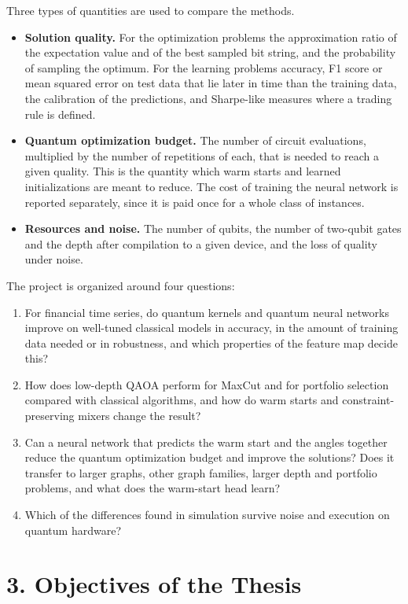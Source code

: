 \documentclass[12pt,a4paper]{article}
\begin{document}
Three types of quantities are used to compare the methods.
\begin{itemize}
  \item \textbf{Solution quality.}  For the optimization problems the
  approximation ratio of the expectation value and of the best sampled
  bit string, and the probability of sampling the optimum.  For the
  learning problems accuracy, F1 score or mean squared error on test
  data that lie later in time than the training data, the calibration
  of the predictions, and Sharpe-like measures where a trading rule
  is defined.
  \item \textbf{Quantum optimization budget.}  The number of circuit
  evaluations, multiplied by the number of repetitions of each, that
  is needed to reach a given quality.  This is the quantity which warm
  starts and learned initializations are meant to reduce.  The cost of
  training the neural network is reported separately, since it is paid
  once for a whole class of instances.
  \item \textbf{Resources and noise.}  The number of qubits, the
  number of two-qubit gates and the depth after compilation to a given
  device, and the loss of quality under noise.
\end{itemize}

The project is organized around four questions:
\begin{enumerate}
  \item For financial time series, do quantum kernels and quantum
  neural networks improve on well-tuned classical models in accuracy,
  in the amount of training data needed or in robustness, and which
  properties of the feature map decide this?
  \item How does low-depth QAOA perform for MaxCut and for portfolio
  selection compared with classical algorithms, and how do warm starts
  and constraint-preserving mixers change the result?
  \item Can a neural network that predicts the warm start and the
  angles together reduce the quantum optimization budget and improve
  the solutions?  Does it transfer to larger graphs, other graph
  families, larger depth and portfolio problems, and what does the
  warm-start head learn?
  \item Which of the differences found in simulation survive noise and
  execution on quantum hardware?
\end{enumerate}

\section*{3. Objectives of the Thesis}
\end{document}
